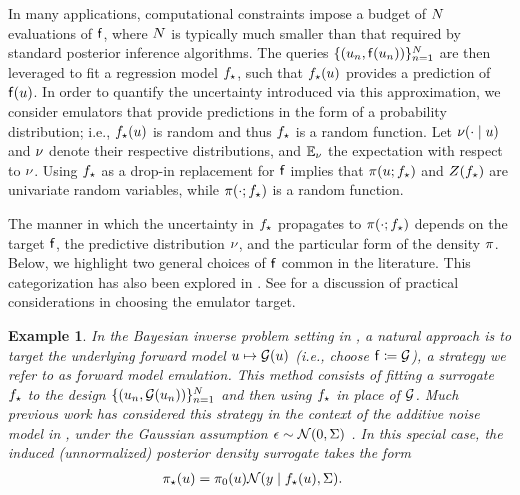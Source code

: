 \documentclass[12pt]{article}
\newtheorem{ex}{Example}
\begin{document}
In many applications, computational constraints impose a budget of 
$N$ evaluations of $\mathsf{f}$, where 
$N$ is typically much smaller than that required by standard posterior
inference algorithms. The queries $\{(u_n, \mathsf{f}(u_n))\}_{n=1}^{N}$
are then leveraged to fit a regression model ${f}_{\star}$,
such that ${f}_{\star}(u)$ provides a prediction of $\mathsf{f}(u)$.
In order to quantify the uncertainty introduced via this approximation, we consider 
emulators that provide predictions in the form of a probability distribution; 
i.e., ${f}_{\star}(u)$ is random and thus ${f}_{\star}$ is a random function. 
Let $\nu(\cdot \mid u)$ and $\nu$ denote their respective distributions,
and $\mathbb{E}_{\nu}$ the expectation with respect to $\nu$.
Using ${f}_{\star}$ as a drop-in replacement for 
$\mathsf{f}$ implies that $\pi(u; {f}_{\star})$ and $Z({f}_{\star})$
are univariate random variables, while $\pi(\cdot; {f}_{\star})$ 
is a random function.

The manner in which the uncertainty in ${f}_{\star}$ propagates to 
$\pi(\cdot; {f}_{\star})$ depends on the target $\mathsf{f}$,
the predictive distribution $\nu$, and the particular form of the 
density $\pi$. Below, we highlight two general choices 
of $\mathsf{f}$ common in the literature. This categorization has also 
been explored in \citet{StuartTeck1,StuartTeck2,GP_PDE_priors}. See
\citet{reviewPaper} for a discussion of practical considerations in choosing 
the emulator target. 

\begin{ex} \label{ex:fwd-em}
In the Bayesian inverse problem setting in ,
a natural approach is to target the underlying forward model 
$u \mapsto \mathcal{G}(u)$ (i.e., choose $\mathsf{f} \coloneqq \mathcal{G}$), a strategy 
we refer to as \textit{forward model emulation}.
This method consists of fitting a surrogate ${f}_{\star}$ to the design 
$\{(u_n, \mathcal{G}(u_n))\}_{n=1}^{N}$ and then using ${f}_{\star}$
in place of $\mathcal{G}$. Much previous work has considered this strategy 
in the context of the additive noise model in ,
under the Gaussian assumption $\epsilon \sim \mathcal{N}(0, \Sigma)$
\citep{StuartTeck1,GP_PDE_priors,hydrologicalModel,hydrologicalModel2,
Surer2023sequential,VillaniAdaptiveGP,weightedIVAR,idealizedGCM,CES}.
In this special case, the induced (unnormalized) posterior density surrogate takes the form
\begin{align}
{\pi}_{\star}(u) &= \pi_0(u) \mathcal{N}(y \mid {f}_{\star}(u), \Sigma). \label{eq:post-em-fwd-Gaussian}
\end{align}
\end{ex}
\end{document}
